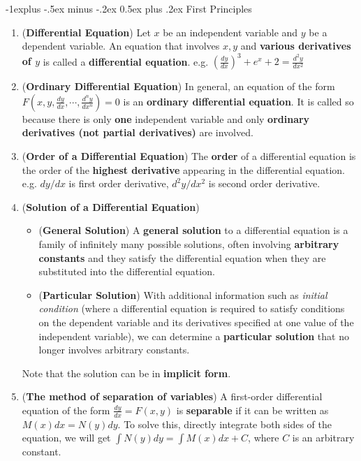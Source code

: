\documentclass[10pt, landscape]{article}
\makeatletter
\renewcommand{\subsection}{\@startsection{subsection}{2}{0mm}%
                                {-1explus -.5ex minus -.2ex}%
                                {0.5ex plus .2ex}%
                                {\normalfont\normalsize\bfseries}}
\makeatother
\begin{document}
\begin{multicols}{4}
\subsection{First Principles}
\begin{enumerate}
    \item (\textbf{Differential Equation}) Let $x$ be an independent variable and $y$ be a dependent variable. An equation that involves $x,y$ and \textbf{various derivatives of $y$} is called a \textbf{differential equation}. e.g. $(\frac{dy}{dx})^3+e^x+2=\frac{d^2y}{dx^2}$
    \item (\textbf{Ordinary Differential Equation}) In general, an equation of the form $F(x,y,\frac{dy}{dx}, \cdots, \frac{d^ny}{dx^n})=0$ is an \textbf{ordinary differential equation}. It is called so because there is only \textbf{one} independent variable and only \textbf{ordinary derivatives (not partial derivatives)} are involved.
    \item (\textbf{Order of a Differential Equation}) The \textbf{order} of a differential equation is the order of the \textbf{highest derivative} appearing in the differential equation. e.g. $dy/dx$ is first order derivative, $d^2y/dx^2$ is second order derivative.
    \item (\textbf{Solution of a Differential Equation})
    \begin{itemize} 
        \item (\textbf{General Solution}) A \textbf{general solution} to a differential equation is a family of infinitely many possible solutions, often involving \textbf{arbitrary constants} and they satisfy the differential equation when they are substituted into the differential equation.
        \item (\textbf{Particular Solution}) With additional information such as \textit{initial condition} (where a differential equation is required to satisfy conditions on the dependent variable and its derivatives specified at one value of the independent variable), we can determine a \textbf{particular solution} that no longer involves arbitrary constants.
    \end{itemize}
    Note that the solution can be in \textbf{implicit form}.
    \item (\textbf{The method of separation of variables}) A first-order differential equation of the form $\frac{dy}{dx}=F(x,y)$ is \textbf{separable} if it can be written as $M(x)dx=N(y)dy$. To solve this, directly integrate both sides of the equation, we will get $\int N(y)dy=\int M(x)dx+C$, where $C$ is an arbitrary constant.

\end{enumerate}
\end{multicols}
\end{document}
